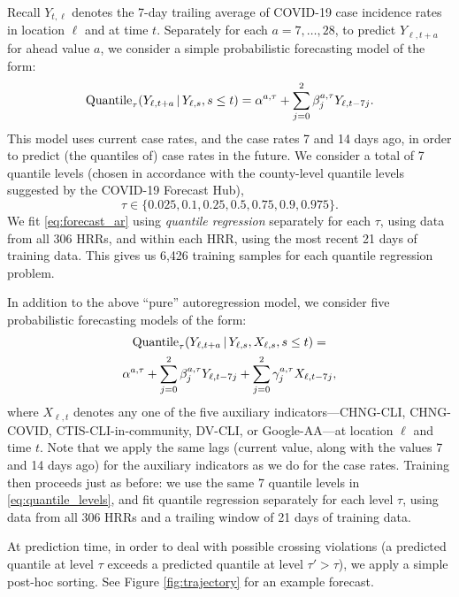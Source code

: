 \documentclass[9pt,twocolumn,twoside,lineno]{pnas-new}
\begin{document}
Recall $Y_{t,\ell}$ denotes the 7-day trailing average of COVID-19 case
incidence rates in location $\ell$ and at time $t$.  Separately for each
$a=7,\ldots,28$, to predict $Y_{\ell,t+a}$ for ahead value $a$, we consider a
simple probabilistic forecasting model of the form:     
\begin{equation}
\label{eq:forecast_ar}
\mathrm{Quantile}_\tau(Y_{\ell,t+a} \,|\, Y_{\ell,s}, s \leq t)  
= \alpha^{a,\tau} + \sum_{j=0}^2 \beta^{a,\tau}_j Y_{\ell,t-7j}.  
\end{equation}
This model uses current case rates, and the case rates 7 and 14 days ago, in
order to predict (the quantiles of) case rates in the future.  We consider a
total of 7 quantile levels (chosen in accordance with the county-level quantile
levels suggested by the COVID-19 Forecast Hub),      
\begin{equation}
\label{eq:quantile_levels}
\tau \in \{0.025, 0.1, 0.25, 0.5, 0.75, 0.9, 0.975 \}.
\end{equation}
We fit \eqref{eq:forecast_ar} using \textit{quantile regression}
\cite{Koenker:1978, Koenker:2005, Koenker:2006} separately for each $\tau$, 
using data from all 306 HRRs, and within each HRR, using the most recent 21 days
of training data.  This gives us 6,426 training samples for each quantile 
regression problem.    

In addition to the above ``pure'' autoregression model, we consider five
probabilistic forecasting models of the form: 
\begin{multline}
\label{eq:forecast_ar_x}
\mathrm{Quantile}_\tau(Y_{\ell,t+a} \,|\, Y_{\ell,s}, X_{\ell,s}, s \leq t)  
= \\ \alpha^{a,\tau} + \sum_{j=0}^2 \beta^{a,\tau}_j Y_{\ell,t-7j} + 
\sum_{j=0}^2 \gamma^{a,\tau}_j X_{\ell,t-7j},
\end{multline}
where $X_{\ell,t}$ denotes any one of the five auxiliary indicators---CHNG-CLI, 
CHNG-COVID, CTIS-CLI-in-community, DV-CLI, or Google-AA---at location $\ell$ and
time $t$. Note that we apply the same lags (current value, along with the values
7 and 14 days ago) for the auxiliary indicators as we do for the case
rates. Training then proceeds just as before: we use the same 7 quantile levels
in \eqref{eq:quantile_levels}, and fit quantile regression separately for each 
level $\tau$, using data from all 306 HRRs and a trailing window of 21 days of
training data.

At prediction time, in order to deal with possible crossing violations (a
predicted quantile at level $\tau$ exceeds a predicted quantile at level $\tau'
> \tau$), we apply a simple post-hoc sorting.  See Figure \ref{fig:trajectory}
for an example forecast. 
\end{document}
